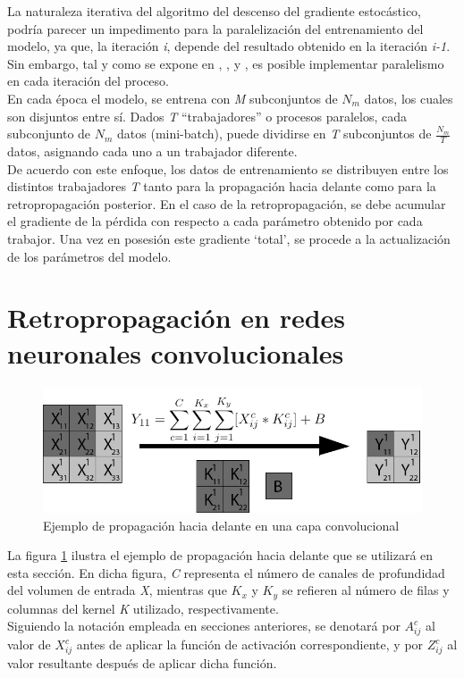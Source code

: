 La naturaleza iterativa del algoritmo del descenso del gradiente estocástico, podría parecer un impedimento para la paralelización del entrenamiento del modelo, ya que, la iteración \textit{i}, depende del resultado obtenido en la iteración \textit{i-1}. Sin embargo, tal y como se expone en \cite{CNN_parallel_Stanford}, \cite{CNN_parallel_International_Conference}, y \cite{CNN_parallel_Ome_Weird_Trick}, es posible implementar paralelismo en cada iteración del proceso. \\
En cada época el modelo, se entrena con \textit{M} subconjuntos de $N_m$ datos, los cuales son disjuntos entre sí. Dados \textit{T} ``trabajadores'' o procesos paralelos, cada subconjunto de $N_m$ datos (mini-batch), puede dividirse en \textit{T} subconjuntos de $\frac{N_m}{T}$ datos, asignando cada uno a un trabajador diferente.\\
De acuerdo con este enfoque, los datos de entrenamiento se distribuyen entre los distintos trabajadores \textit{T} tanto para la propagación hacia delante como para la retropropagación posterior. En el caso de la retropropagación, se debe acumular el gradiente de la pérdida con respecto a cada parámetro obtenido por cada trabajor. Una vez en posesión este gradiente `total', se procede a la actualización de los parámetros del modelo.

\section{Retropropagación en redes neuronales convolucionales}

\begin{figure}[H]
	\centering
	\includegraphics[width=0.8\linewidth]{imagenes/conv_ejemplo_backprop_1.jpg} 
	\caption{Ejemplo de propagación hacia delante en una capa convolucional}
	\label{fig:ejemplo_forward_prop_convolucional}
\end{figure}

La figura \ref{fig:ejemplo_forward_prop_convolucional} ilustra el ejemplo de propagación hacia delante que se utilizará en esta sección. En dicha figura, \textit{C} representa el número de canales de profundidad del volumen de entrada \textit{X}, mientras que ${K_x}$ y ${K_y}$ se refieren al número de filas y columnas del kernel \textit{K} utilizado, respectivamente. \\
Siguiendo la notación empleada en secciones anteriores, se denotará por $A^c_{ij}$ al valor de $X^c_{ij}$ antes de aplicar la función de activación correspondiente, y por $Z^c_{ij}$ al valor resultante después de aplicar dicha función.


